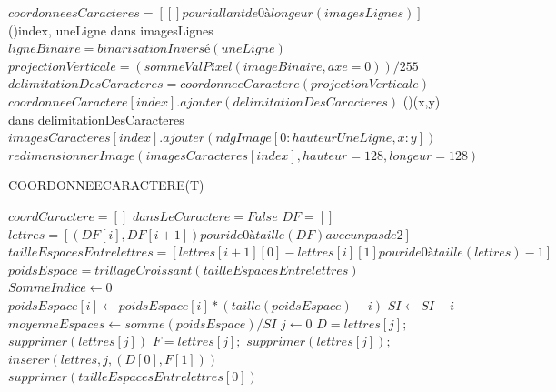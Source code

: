 \documentclass[a4paper]{article}
\begin{document}
\begin{algorithm}
				$coordonneesCaracteres = [[] pour i allant de 0 à longeur(imagesLignes)]$\;
				\BlankLine
				\For(){index, uneLigne dans imagesLignes}
				{
					$ligneBinaire = binarisationInversé(uneLigne)$\;
					$projectionVerticale = (sommeValPixel(imageBinaire, axe=0)) / 255$\;
					$delimitationDesCaracteres = coordonneeCaractere(projectionVerticale)$\;
					\BlankLine
					$coordonneeCaractere[index].ajouter(delimitationDesCaracteres)$\;
    				\For(){(x,y) dans delimitationDesCaracteres}
					{
						$imagesCaracteres[index].ajouter(ndgImage[0:hauteurUneLigne, x:y])$\;
					}
					$redimensionnerImage(imagesCaracteres[index],hauteur = 128,longeur = 128)$\;
					\BlankLine
				}
			\end{algorithm}
			\newpage
			\begin{algorithm}
				\LinesNumbered
				\caption{COORDONNEECARACTERE(T)}\label{alg:coordcar}
				\BlankLine
				$coordCaractere = []$\;
				\BlankLine
				$dansLeCaractere = False$\;
				$DF = []$\;
				\BlankLine
				{
				}
				$lettres = [ (DF[i],DF[i+1]) pour i de 0 à taille(DF) avec un pas de 2 ]$\;
				\BlankLine
				$tailleEspacesEntrelettres = [ lettres[i+1][0]-lettres[i][1] pour i de 0 à taille(lettres)-1 ]$\;
				$poidsEspace = trillageCroissant(tailleEspacesEntrelettres)$\;
				\BlankLine
				$SommeIndice \gets 0$\;
				{
					$poidsEspace[i] \gets poidsEspace[i] * (taille(poidsEspace)-i)$\;
				    $SI \gets SI + i$\;
				}
				$moyenneEspaces \gets somme(poidsEspace) / SI$\;
				$j \gets 0$\;
				{
					 {
						$D = lettres[j];$ $supprimer(lettres[j])$\;
						$F = lettres[j];$ $supprimer(lettres[j]);$\;
						$inserer(lettres,j,(D[0],F[1]))$\;
					}	
					$supprimer(tailleEspacesEntrelettres[0])$\;
				}
			\end{algorithm}
\end{document}

